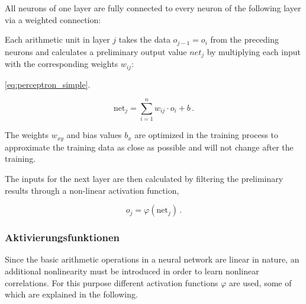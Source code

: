 		All neurons of one layer are fully connected to every neuron of the following layer via a weighted connection:
		
		Each arithmetic unit in layer $j$ takes the data $o_{j-1} = o_i$ from the preceding neurons and calculates a preliminary output value $net_j$ by multiplying each input with the corresponding weights $w_{ij}$:
		
		 \ref{eq:perceptron_simple}. 
		
		\begin{equation}
			\label{eq:perceptron_simple}
			\text{net}_j = \sum_{i=1}^{n} w_{ij} \cdot o_i + b \, . 
		\end{equation}
		
		The weights $w_{xy}$ and bias values $b_x$ are optimized in the training process to approximate the training data as close as possible and will not change after the training.
		
		
		The inputs for the next layer are then calculated by filtering the preliminary results through a non-linear activation function,
		
		\begin{equation}
		\label{eq:perceptron_act}
		o_j = \varphi\left(\text{net}_j\right) \, . 
		\end{equation}
		

		
		 
		\subsubsection { Aktivierungsfunktionen }
		Since the basic arithmetic operations in a neural network are linear in nature, an additional nonlinearity must be introduced in order to learn nonlinear correlations. 
For this purpose different activation functions $\varphi$ are used, some of which are explained in the following.\\

